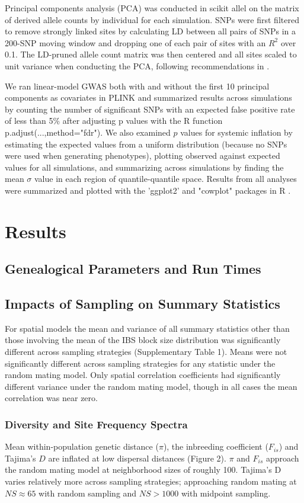 \documentclass[9pt,twocolumn,twoside,lineno]{gsajnl}
\begin{document}
Principal components analysis (PCA) was conducted in scikit allel on the matrix of derived allele counts by individual for each simulation. SNPs were first filtered to remove strongly linked sites by calculating LD between all pairs of SNPs in a 200-SNP moving window and dropping one of each pair of sites with an $R^2$ over 0.1. The LD-pruned allele count matrix was then centered and all sites scaled to unit variance when conducting the PCA, following recommendations in \citep{Patterson2006}.   

We ran linear-model GWAS both with and without the first 10 principal components as covariates in PLINK and summarized results across simulations by counting the number of significant SNPs with an expected false positive rate of less than 5\% after adjusting p values with the R function p.adjust(...,method="fdr"). We also examined $p$ values for systemic inflation by estimating the expected values from a uniform distribution (because no SNPs were used when generating phenotypes), plotting observed against expected values for all simulations, and summarizing across simulations by finding the mean $\sigma$ value in each region of quantile-quantile space. Results from all analyses were summarized and plotted with the 'ggplot2' \citep{Wickham2016} and "cowplot" \citep{Wilke2019} packages in R \citep{Rcore2018}. 

\section{Results}

\subsection{Genealogical Parameters and Run Times}
\subsection{Impacts of Sampling on Summary Statistics}
For spatial models the mean and variance of all summary statistics other than those involving the mean of the IBS block size distribution was significantly different across sampling strategies (Supplementary Table 1). Means were not significantly different across sampling strategies for any statistic under the random mating model. Only spatial correlation coefficients had significantly different variance under the random mating model, though in all cases the mean correlation was near zero.

\subsubsection{Diversity and Site Frequency Spectra}
Mean within-population genetic distance ($\pi$), the inbreeding coefficient ($F_{is}$) and Tajima's $D$ are inflated at low dispersal distances (Figure 2). $\pi$ and $F_{is}$ approach the random mating model at neighborhood sizes of roughly 100. Tajima's D varies relatively more across sampling strategies; approaching random mating at $NS\approx65$ with random sampling and $NS>1000$ with midpoint sampling.
\end{document}

